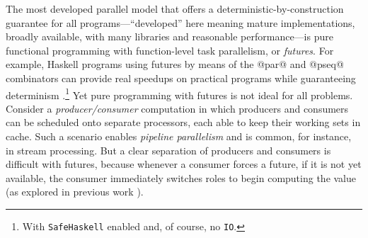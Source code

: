 The {most} developed parallel model that offers a
deterministic-by-construction guarantee for all
programs---``developed'' here meaning mature implementations, broadly
available, with many libraries and reasonable performance---is pure
functional programming with function-level task parallelism, or {\em
  futures}.  For example, Haskell programs using futures by means of
the @par@ and @pseq@ combinators can provide
real speedups on practical programs while guaranteeing determinism
\cite{marlow-par}.\footnote{With 
    \lstinline|SafeHaskell| enabled and, of course, no \lstinline|IO|.}
Yet pure programming with futures is not ideal for all problems.
Consider a {\em producer/consumer} computation in which producers and 
consumers can be scheduled onto separate processors, each able to keep
their working sets in cache.  Such a scenario enables
{\em pipeline parallelism} and is common, for instance, in
stream processing.  But a clear separation of producers and consumers is
difficult with futures, because
whenever a consumer forces a future, if it is not yet available,
the consumer immediately switches roles to begin computing the value
(as explored in previous work \cite{monad-par}).

%



